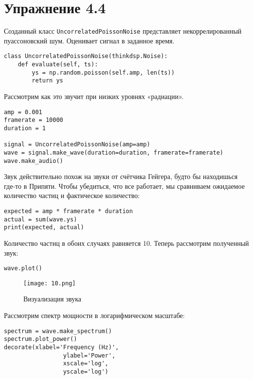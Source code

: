 \documentclass[a4paper,12pt]{report}
\begin{document}
\chapter{Упражнение 4.4}

Созданный класс \texttt{UncorrelatedPoissonNoise} представляет некоррелированный пуассоновский шум. Оценивает сигнал в заданное время.

\begin{lstlisting}[caption=Созданный класс UncorrelatedPoissonNoise]
class UncorrelatedPoissonNoise(thinkdsp.Noise):
    def evaluate(self, ts):
        ys = np.random.poisson(self.amp, len(ts))
        return ys
\end{lstlisting}

Рассмотрим как это звучит при низких уровнях «радиации».

\begin{lstlisting}[caption=Создание звука]
amp = 0.001
framerate = 10000
duration = 1

signal = UncorrelatedPoissonNoise(amp=amp)
wave = signal.make_wave(duration=duration, framerate=framerate)
wave.make_audio()
\end{lstlisting}

Звук действительно похож на звуки от счётчика Гейгера, будто бы находишься где-то в Припяти. Чтобы убедиться, что все работает, мы сравниваем ожидаемое количество частиц и фактическое количество:

\begin{lstlisting}[caption=Создание звука]
expected = amp * framerate * duration
actual = sum(wave.ys)
print(expected, actual)
\end{lstlisting}

Количество частиц в обоих случаях равняется 10. Теперь рассмотрим полученный звук:

\begin{lstlisting}[caption=Визуализация звука]
wave.plot()
\end{lstlisting}

\begin{figure}[H]
        \centering
        \texttt{[image: 10.png]}
        \caption{Визуализация звука}
        \label{fig:lab4_fig4_1}
\end{figure}

Рассмотрим спектр мощности в логарифмическом масштабе:

\begin{lstlisting}[caption=Спектр мощности звука]
spectrum = wave.make_spectrum()
spectrum.plot_power()
decorate(xlabel='Frequency (Hz)',
                 ylabel='Power',
                 xscale='log', 
                 yscale='log')
\end{lstlisting}
\end{document}
